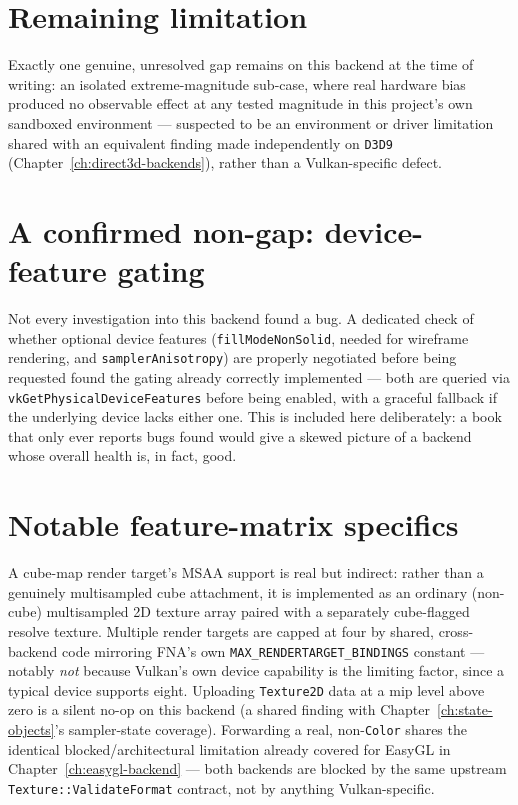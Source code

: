 \section{Remaining limitation}
\label{sec:vulkan-depthbias}

Exactly one genuine, unresolved gap remains on this backend at the time of writing: an
isolated  extreme-magnitude sub-case, where real hardware
bias produced no observable effect at any tested magnitude in this project's own sandboxed
environment --- suspected to be an environment or driver limitation shared with an equivalent
finding made independently on \texttt{D3D9} (Chapter~\ref{ch:direct3d-backends}), rather than
a Vulkan-specific defect.

\section{A confirmed non-gap: device-feature gating}

Not every investigation into this backend found a bug. A dedicated check of whether optional
device features (\texttt{fillModeNonSolid}, needed for wireframe rendering, and
\texttt{samplerAnisotropy}) are properly negotiated before being requested found the gating
already correctly implemented --- both are queried via \texttt{vkGetPhysicalDeviceFeatures}
before being enabled, with a graceful fallback if the underlying device lacks either one.
This is included here deliberately: a book that only ever reports bugs found would give a
skewed picture of a backend whose overall health is, in fact, good.

\section{Notable feature-matrix specifics}

A cube-map render target's MSAA support is real but indirect: rather than a genuinely
multisampled cube attachment, it is implemented as an ordinary (non-cube) multisampled 2D
texture array paired with a separately cube-flagged resolve texture. Multiple render targets
are capped at four by shared, cross-backend code mirroring FNA's own
\texttt{MAX\_RENDERTARGET\_BINDINGS} constant --- notably \emph{not} because Vulkan's own
device capability is the limiting factor, since a typical device supports eight. Uploading
\texttt{Texture2D} data at a mip level above zero is a silent no-op on this backend (a shared
finding with Chapter~\ref{ch:state-objects}'s sampler-state coverage). Forwarding a real,
non-\texttt{Color}  shares the identical blocked/architectural
limitation already covered for EasyGL in Chapter~\ref{ch:easygl-backend} --- both backends
are blocked by the same upstream \texttt{Texture::ValidateFormat} contract, not by anything
Vulkan-specific.

